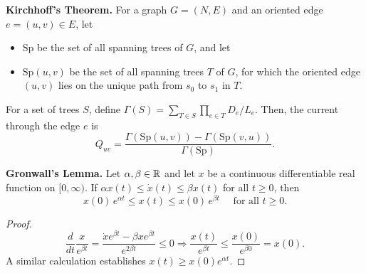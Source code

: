 \documentclass[11pt,a4paper]{article}
\newcommand{\Real}{\R}
\newcommand{\sptree}{\mathrm{Sp}}
\begin{document}
\noindent
\textbf{Kirchhoff's Theorem.} 
For a graph $G=(N,E)$ and an oriented edge $e=(u,v) \in E$, let 
\begin{itemize}
\item $\sptree$ be the set of all spanning trees of $G$, and let
\item $\sptree(u,v)$ be the set of all spanning trees $T$ of $G$, for which the oriented edge $(u,v)$ lies on the unique path from $s_0$ to $s_1$ in $T$.  
\end{itemize} 
For a set of trees $S$, define $\Gamma(S) = \sum_{T \in S} \prod_{e \in T} D_e/L_e$. 
Then, the current through the edge $e$ is   
\begin{equation}
\label{eq:matrix-tree}
Q_{uv} = \frac{ \Gamma(\sptree(u,v))  - \Gamma(\sptree(v,u))}{ \Gamma(\sptree) }. 
\end{equation}\smallskip

\noindent
\textbf{Gronwall's Lemma. }%
Let $\alpha, \beta \in \Real$ and let $x$ be a continuous differentiable real function on $[0,\infty)$. 
If $\alpha x(t) \le \dot{x}(t) \le \beta x(t)$ for all $t \ge 0$, 
then $$x(0) \, e^{\alpha t} \le x(t) \le x(0) \, e^{\beta t} \quad \text{ for all } t \ge 0.$$  
\begin{proof}
$$ \frac{d}{dt} \frac{x}{e^{\beta t}} = \frac{\dot{x} e^{\beta t} - \beta x e^{\beta t}}{e^{2 \beta t}} \le 0 \Rightarrow \frac{x(t)}{e^{\beta t}} \le \frac{x(0)}{e^{\beta 0}} = x(0). $$ 
A similar calculation establishes $x(t) \ge x(0) e^{\alpha t}$. 
\end{proof}
\end{document}
